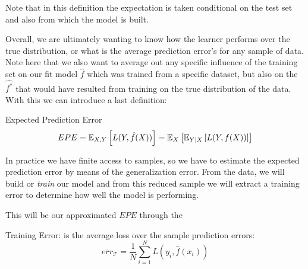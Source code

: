 

Note that in this definition the expectation is taken conditional on the test set and also from which the model is built.

Overall, we are ultimately wanting to know how the learner performs over the true distribution, or what is the average prediction error's for any sample of data.
Note here that we also want to average out any specific influence of the training set on our fit model $\hat{f}$ which was trained from a specific dataset, but also on the $\hat{f^*}$ that would have resulted from training on the true distribution of the data.
With this we can introduce a last definition:
\begin{definition}{Expected Prediction Error}
	\begin{equation}
	 EPE = \operatorname{\mathbb{E}}_{X,Y} \left[ L(Y,\hat{f}(X))\right] = \operatorname{\mathbb{E}}_X \left[  \operatorname{\mathbb{E}}_{Y | X} \left[   L(Y,f(X))  \right]  \right]
	\end{equation}
\end{definition}


In practice we have finite access to samples, so we have to estimate the expected prediction error by means of the generalization error.
From the data, we will build or \textit{train} our model and from this reduced sample we will extract a training error to determine how well the model is performing.

This will be our approximated $EPE$ through the

\begin{definition}{Training Error:}
	is the average loss over the sample prediction errors:
	$$ \overline{err}_{\mathcal{T}} = \frac{1}{N} \sum_{i=1}^N L(y_i, \hat{f}(x_i) )$$
\end{definition}\label{def:trainingError}


